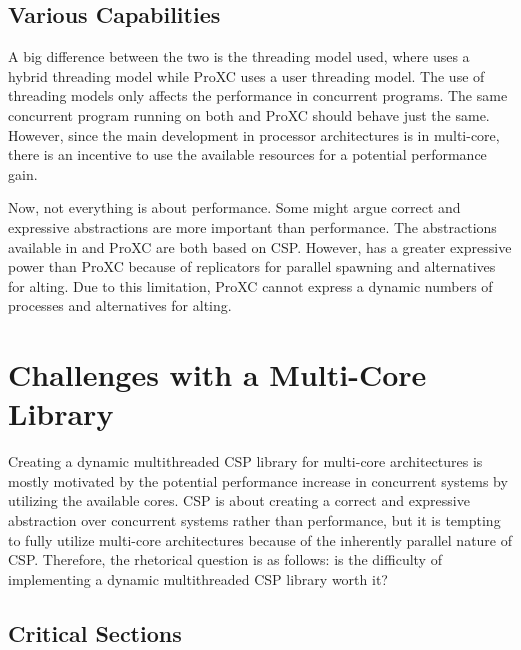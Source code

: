 \section{Various Capabilities}


A big difference between the two is the threading model used, where \Proxc{} uses a hybrid threading model while ProXC uses a user threading model. The use of threading models only affects the performance in concurrent programs. The same concurrent program running on both \Proxc{} and ProXC should behave just the same. However, since the main development in processor architectures is in multi\hyp{}core, there is an incentive to use the available resources for a potential performance gain.

Now, not everything is about performance. Some might argue correct and expressive abstractions are more important than performance. The abstractions available in \Proxc{} and ProXC are both based on CSP. However, \Proxc{} has a greater expressive power than ProXC because of replicators for parallel spawning and alternatives for alting. Due to this limitation, ProXC cannot express a dynamic numbers of processes and alternatives for alting.


\chapter{Challenges with a Multi\hyp{}Core Library}
\label{ch:difficulty_multicore_csp}

Creating a dynamic multithreaded CSP library for multi\hyp{}core architectures is mostly motivated by the potential performance increase in concurrent systems by utilizing the available cores. CSP is about creating a correct and expressive abstraction over concurrent systems rather than performance, but it is tempting to fully utilize multi\hyp{}core architectures because of the inherently parallel nature of CSP. Therefore, the rhetorical question is as follows: is the difficulty of implementing a dynamic multithreaded CSP library worth it?


\section{Critical Sections}


